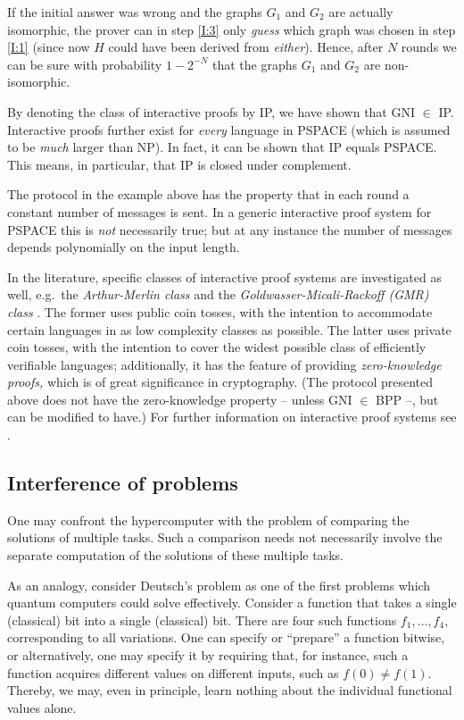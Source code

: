 \documentclass[12pt]{article}
\begin{document}
If the initial answer was wrong and the graphs $G_1$ and $G_2$ are actually isomorphic,
the prover can in step \ref{I:3} only \emph{guess} which graph
was chosen in step \ref{I:1} (since now $H$ could have been derived from
\emph{either}). Hence, after $N$ rounds we can be sure with probability
$1-2^{-N}$ that the graphs $G_1$ and $G_2$ are non-isomorphic.

By denoting the class of interactive proofs by IP, we have shown that
GNI $\in$ IP. Interactive proofs further exist for \emph{every} language in
PSPACE (which is assumed to be \emph{much} larger than NP). In fact, it can be shown
\cite{sha:92} that IP equals PSPACE. This means, in particular, that
IP is closed under complement.

The protocol in the example above has the property that in each round a constant number
of messages is sent. In a generic interactive proof system for
PSPACE this is \emph{not} necessarily true; but at any instance the number of messages depends
polynomially on the input length.

In the literature, specific classes of interactive proof systems are investigated
as well, e.g.\ the \emph{Arthur-Merlin class} \cite{bab:85} and
the \emph{Goldwasser-Micali-Rackoff (GMR)  class} \cite{GMR:85}. The former uses public coin tosses, with the
intention to accommodate certain languages in as low complexity classes as possible.
The latter uses private coin tosses, with the intention to cover the widest
possible class of efficiently verifiable languages;
additionally, it has the feature of providing \emph{zero-knowledge proofs,}
which is of great significance in cryptography. (The protocol presented above does
not have the zero-knowledge property -- unless GNI $\in$ BPP --, but can be modified
to have.) For further information on interactive proof systems see \cite{BM:88,gold:01}.

\subsection{Interference of problems}

One may confront the hypercomputer with the problem
of comparing the solutions of multiple tasks.
Such a comparison needs not necessarily involve the separate computation of the solutions of these multiple tasks.

As an analogy, consider Deutsch's problem as one of the first problems which
quantum computers could solve effectively.
Consider a function that takes a single (classical) bit into a single (classical) bit.
There are four such functions $f_1,\ldots ,f_4$, corresponding to all variations.
One can specify or ``prepare'' a function bitwise, or alternatively,
one may specify it by requiring that, for instance, such a function
acquires different values on different inputs, such as $f(0)\neq f(1)$.
Thereby, we may, even in principle, learn nothing about the individual functional values alone.
\end{document}
